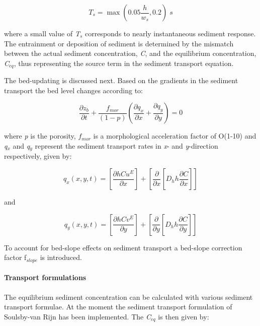 \begin{equation} \label{2.58)} 
T_{s} =\max \left(0.05\frac{h}{w_{s} } ,0.2\right)\; s 
\end{equation} 

where a small value of \textit{T${}_{s}$ }corresponds to nearly instantaneous sediment response. The entrainment or deposition of sediment is determined by the mismatch between the actual sediment concentration, \textit{C}, and the equilibrium concentration, \textit{C${}_{eq}$}, thus representing the source term in the sediment transport equation. 

The bed-updating is discussed next. Based on the gradients in the sediment transport the bed level changes according to:

\begin{equation} \label{2.59)} 
\frac{\partial z_{b} }{\partial t} +\frac{f_{mor} }{\left(1-p\right)} \left(\frac{\partial q_{x} }{\partial x} +\frac{\partial q_{y} }{\partial y} \right)=0 
\end{equation} 

where \textit{p }is the porosity, $f_{mor} $ is a morphological acceleration factor of O(1-10) \citep[e.g.][]{Reniers2004a}  and\textit{ q${}_{x}$} and \textit{q${}_{y}$} represent the sediment transport rates in \textit{x}- and \textit{y}-direction respectively, given by:

\begin{equation} \label{2.60)} 
q_{x} (x,y,t)=\left[\frac{\partial hCu^{E} }{\partial x} \right]+\left[\frac{\partial }{\partial x} \left[D_{h} h\frac{\partial C}{\partial x} \right]\right] 
\end{equation} 

and

\begin{equation} \label{2.61)} 
q_{y} (x,y,t)=\left[\frac{\partial hCv^{E} }{\partial y} \right]+\left[\frac{\partial }{\partial y} \left[D_{h} h\frac{\partial C}{\partial y} \right]\right] 
\end{equation} 

To account for bed-slope effects on sediment transport a bed-slope correction factor f${}_{slope}$ is introduced. 

\paragraph{Transport formulations}

The equilibrium sediment concentration can be calculated with various sediment transport formulae. At the moment the sediment transport formulation of Soulsby-van Rijn \citep{Soulsby1997} has been implemented. The \textit{C${}_{eq}$} is then given by:

